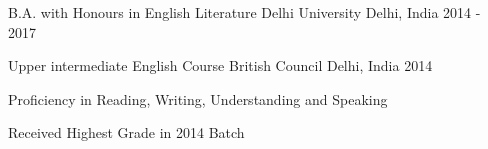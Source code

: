 \begin{cventries}
  \cventry
    {B.A. with Honours in English Literature} %
    {Delhi University} %
    {Delhi, India} %
    {2014 - 2017} %
    {}
  
  \cventry
    {Upper intermediate English Course}
    {British Council}
    {Delhi, India}
    {2014}
    {
      \begin{cvitems}
        \item {Proficiency in Reading, Writing, Understanding and Speaking}
        \item {Received Highest Grade in 2014 Batch}
      \end{cvitems}
    }
\end{cventries}
